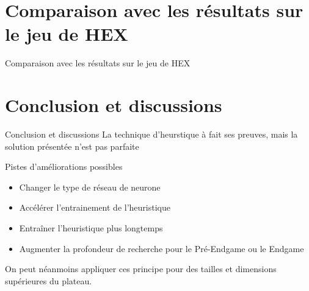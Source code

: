 \documentclass{beamer}
\begin{document}
\section{Comparaison avec les résultats sur le jeu de HEX}

\begin{frame}{Comparaison avec les résultats sur le jeu de HEX}
    
\end{frame}

\section{Conclusion et discussions}

\begin{frame}{Conclusion et discussions}
    La technique d'heurstique à fait ses preuves, mais la solution présentée n'est pas parfaite
    \begin{block}{Pistes d'améliorations possibles}
        \begin{itemize}
            \item Changer le type de réseau de neurone
            \item Accélérer l'entrainement de l'heuristique
            \item Entraîner l'heuristique plus longtemps
            \item Augmenter la profondeur de recherche pour le Pré-Endgame ou le Endgame
        \end{itemize}
    \end{block}
    On peut néanmoins appliquer ces principe pour des tailles et dimensions supérieures du plateau.
\end{frame}
\end{document}
